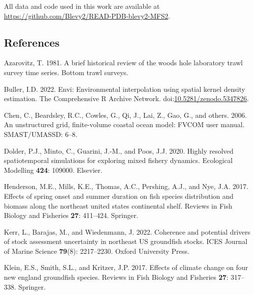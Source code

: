 \documentclass[
  12pt,
]{article}
\newlength{\cslhangindent}
\newlength{\cslentryspacingunit} %
\newenvironment{CSLReferences}[2] %
 {%
  \setlength{\parindent}{0pt}
  \ifodd #1
  \let\oldpar\par
  \def\par{\hangindent=\cslhangindent\oldpar}
  \fi
  \setlength{\parskip}{#2\cslentryspacingunit}
 }%
 {}
\begin{document}
All data and code used in this work are available at \url{https://github.com/Blevy2/READ-PDB-blevy2-MFS2}.

\hypertarget{references}{%
\subsection{References}\label{references}}

\hypertarget{refs}{}
\begin{CSLReferences}{1}{0}
\leavevmode{}%
Azarovitz, T. 1981. A brief historical review of the woods hole laboratory trawl survey time series. Bottom trawl surveys.

\leavevmode{}%
Buller, I.D. 2022. Envi: Environmental interpolation using spatial kernel density estimation. The Comprehensive R Archive Network. doi:\href{https://doi.org/10.5281/zenodo.5347826}{10.5281/zenodo.5347826}.

\leavevmode{}%
Chen, C., Beardsley, R.C., Cowles, G., Qi, J., Lai, Z., Gao, G., and others. 2006. An unstructured grid, finite-volume coastal ocean model: FVCOM user manual. SMAST/UMASSD: 6--8.

\leavevmode{}%
Dolder, P.J., Minto, C., Guarini, J.-M., and Poos, J.J. 2020. Highly resolved spatiotemporal simulations for exploring mixed fishery dynamics. Ecological Modelling \textbf{424}: 109000. Elsevier.

\leavevmode{}%
Henderson, M.E., Mills, K.E., Thomas, A.C., Pershing, A.J., and Nye, J.A. 2017. Effects of spring onset and summer duration on fish species distribution and biomass along the northeast united states continental shelf. Reviews in Fish Biology and Fisheries \textbf{27}: 411--424. Springer.

\leavevmode{}%
Kerr, L., Barajas, M., and Wiedenmann, J. 2022. Coherence and potential drivers of stock assessment uncertainty in northeast US groundfish stocks. ICES Journal of Marine Science \textbf{79}(8): 2217--2230. Oxford University Press.

\leavevmode{}%
Klein, E.S., Smith, S.L., and Kritzer, J.P. 2017. Effects of climate change on four new england groundfish species. Reviews in Fish Biology and Fisheries \textbf{27}: 317--338. Springer.


\end{CSLReferences}
\end{document}
